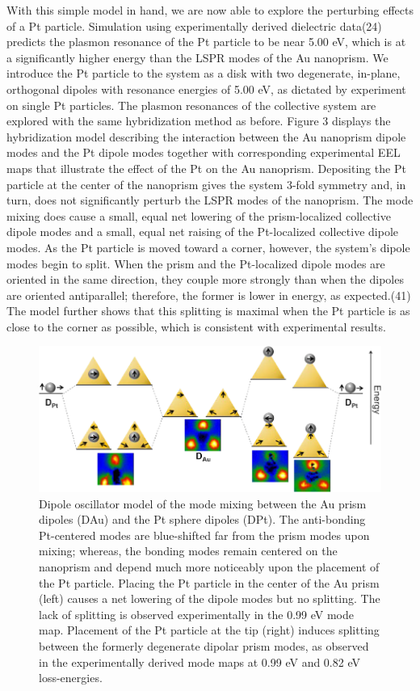 \documentclass [11pt, proquest] {uwthesis}[2016/11/22]
\begin{document}
With this simple model in hand, we are now able to explore the perturbing effects of a Pt particle. Simulation using experimentally derived dielectric data(24) predicts the plasmon resonance of the Pt particle to be near 5.00 eV, which is at a significantly higher energy than the LSPR modes of the Au nanoprism. We introduce the Pt particle to the system as a disk with two degenerate, in-plane, orthogonal dipoles with resonance energies of 5.00 eV, as dictated by experiment on single Pt particles. The plasmon resonances of the collective system are explored with the same hybridization method as before.
Figure 3 displays the hybridization model describing the interaction between the Au nanoprism dipole modes and the Pt dipole modes together with corresponding experimental EEL maps that illustrate the effect of the Pt on the Au nanoprism. Depositing the Pt particle at the center of the nanoprism gives the system 3-fold symmetry and, in turn, does not significantly perturb the LSPR modes of the nanoprism. The mode mixing does cause a small, equal net lowering of the prism-localized collective dipole modes and a small, equal net raising of the Pt-localized collective dipole modes. As the Pt particle is moved toward a corner, however, the system’s dipole modes begin to split. When the prism and the Pt-localized dipole modes are oriented in the same direction, they couple more strongly than when the dipoles are oriented antiparallel; therefore, the former is lower in energy, as expected.(41) The model further shows that this splitting is maximal when the Pt particle is as close to the corner as possible, which is consistent with experimental results.

\begin{figure}
\begin{centering}
\includegraphics{prisms_theory.png}
\caption{Dipole oscillator model of the mode mixing between the Au prism dipoles (DAu) and the Pt sphere dipoles (DPt). The anti-bonding Pt-centered modes are blue-shifted far from the prism modes upon mixing; whereas, the bonding modes remain centered on the nanoprism and depend much more noticeably upon the placement of the Pt particle. Placing the Pt particle in the center of the Au prism (left) causes a net lowering of the dipole modes but no splitting. The lack of splitting is observed experimentally in the 0.99 eV mode map. Placement of the Pt particle at the tip (right) induces splitting between the formerly degenerate dipolar prism modes, as observed in the experimentally derived mode maps at 0.99 eV and 0.82 eV loss-energies.}
\label{mo_diagram}
\end{centering}
\end{figure}
\end{document}
